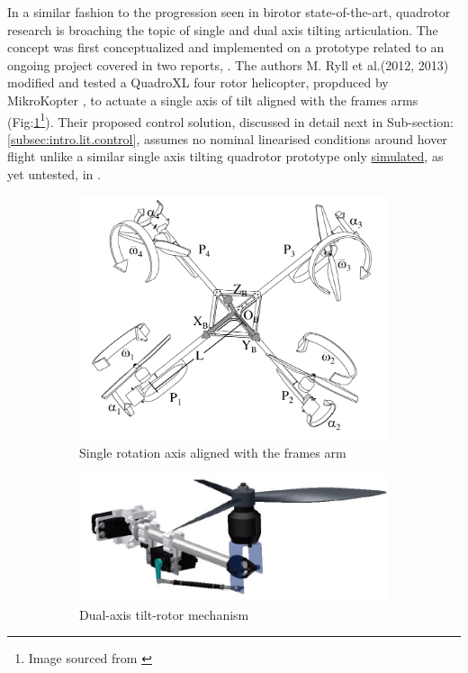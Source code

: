 \par
In a similar fashion to the progression seen in birotor state-of-the-art, quadrotor research is broaching the topic of single and dual axis tilting articulation. The concept was first conceptualized and implemented on a prototype related to an ongoing project covered in two reports, \cite{tiltpropellercontrol,tiltpropellerflight}. The authors M. Ryll et al.(2012, 2013) modified and tested a QuadroXL four rotor helicopter, propduced by MikroKopter \cite{mikrokopter}, to actuate a single axis of tilt aligned with the frames arms (Fig:\ref{fig:tiltpropellercontrol1}\footnote{Image sourced from \cite{tiltpropellercontrol}}). Their proposed control solution, discussed in detail next in Sub-section:\ref{subsec:intro.lit.control}, assumes no nominal linearised conditions around hover flight unlike a similar single axis tilting quadrotor prototype only \underline{simulated}, as yet untested, in \cite{singleaxistilting}. 
\begin{figure}[htbp]
\centering
\begin{subfigure}{.5\textwidth}
\includegraphics[width=\textwidth]{figs/tiltpropellercontrol1}
\caption{Single rotation axis aligned with the frames arm}
\label{fig:tiltpropellercontrol1}
\end{subfigure}%
\begin{subfigure}{.5\textwidth}
\includegraphics[width=\textwidth]{figs/gasco-mech}
\caption{Dual-axis tilt-rotor mechanism}
\label{fig:tiltrotor-gasco}
\end{subfigure}
\caption{}
\label{fig:tiltprop}
\end{figure}
